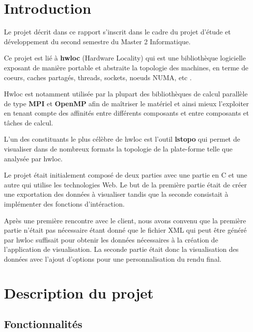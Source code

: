 \documentclass [a4paper,11pt]{article}
\begin{document}
\section{Introduction}
Le projet décrit dans ce rapport s'inscrit dans le cadre du projet d'étude et développement du second semestre du Master 2 Informatique.
\newline

Ce projet est lié à \textbf{hwloc} (Hardware Locality) qui est une bibliothèque logicielle exposant de manière portable et abstraite la topologie des machines, en terme de coeurs, caches partagés, threads, sockets, noeuds NUMA, etc \cite{lstopo}.
\newline

Hwloc est notamment utilisée par la plupart des bibliothèques de calcul parallèle de type \textbf{MPI} et \textbf{OpenMP} afin de maîtriser le matériel et ainsi mieux l'exploiter en tenant compte des affinités entre différents composants et entre composants et tâches de calcul.
\newline

L'un des constituants le plus célèbre de hwloc est l'outil \textbf{lstopo} qui permet de visualiser dans de nombreux formats la topologie de la plate-forme telle que analysée par hwloc.
\newline

Le projet était initialement composé de deux parties avec une partie en C et une autre qui utilise les technologies Web. Le but de la première partie était de créer une exportation des données à visualiser tandis que la seconde consistait à implémenter des fonctions d'intéraction.
\newline

Après une première rencontre avec le client, nous avons convenu que la première partie n'était pas nécessaire étant donné que le fichier XML qui peut être généré par hwloc suffisait pour obtenir les données nécessaires à la création de l'application de visualisation. La seconde partie était donc la visualisation des données avec l'ajout d'options pour une personnalisation du rendu final.

\newpage

\section{Description du projet}

\subsection{Fonctionnalités}
\end{document}
